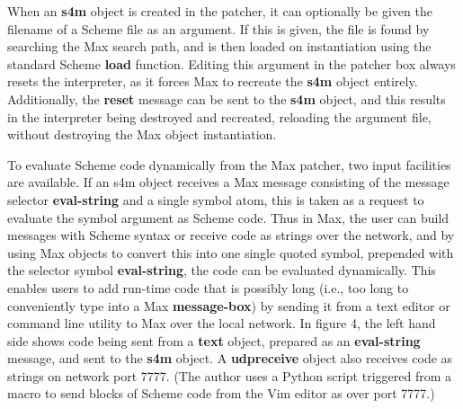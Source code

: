 \documentclass[acmsmall]{acmart}
\begin{document}
When an \textbf{s4m} object is created in the patcher, it can optionally be given
the filename of a Scheme file as an argument. If this is given, the
file is found by searching the Max search path, and is then loaded on 
instantiation using the standard Scheme \textbf{load} function.
Editing this argument in the patcher box always resets the
interpreter, as it forces Max to recreate the \textbf{s4m} object entirely. Additionally,
the \textbf{reset} message can be sent to the \textbf{s4m} object, and this results in 
the interpreter being destroyed and recreated, reloading the argument file,
without destroying the Max object instantiation.

To evaluate Scheme code dynamically from the Max patcher, two input facilities
are available. If an s4m object receives a Max message consisting of the 
message selector \textbf{eval-string} and a single symbol atom, 
this is taken as a request to evaluate the symbol argument as Scheme code. 
Thus in Max, the user can build messages
with Scheme syntax or receive code as strings over the network, and by
using Max objects to convert this into one single quoted symbol, prepended
with the selector symbol \textbf{eval-string}, the code can be evaluated dynamically.
This enables users to add run-time code that is possibly long 
(i.e., too long to conveniently type into a Max \textbf{message-box}) by
sending it from a text editor or command line utility to Max over the 
local network. In figure 4, the left hand side shows code being sent
from a \textbf{text} object, prepared as an \textbf{eval-string} message, and sent to
the \textbf{s4m} object. A \textbf{udpreceive} object also receives code as strings
on network port 7777. (The author uses a Python script triggered
from a macro to send blocks of Scheme code from the Vim editor as
over port 7777.)
\end{document}
